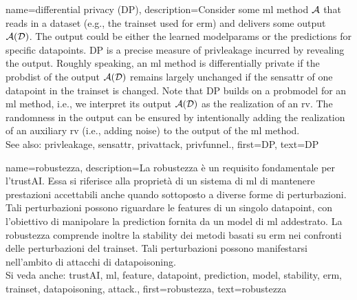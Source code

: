 {name={differential privacy (DP)},
  description={Consider some \gls{ml} method $\mathcal{A}$ 
  	that reads in a \gls{dataset} (e.g., the \gls{trainset} 
  	used for \gls{erm}) and delivers some output $\mathcal{A}(\mathcal{D})$. The output 
  	could be either the learned \gls{modelparams} or the \glspl{prediction} for specific \glspl{datapoint}. 
  	DP is a precise measure of \gls{privleakage} incurred by revealing the 
  	output. Roughly speaking, an \gls{ml} method is differentially private if the \gls{probdist} 
  	of the output $\mathcal{A}(\mathcal{D})$ remains largely unchanged if the \gls{sensattr} 
  	of one \gls{datapoint} in the \gls{trainset} is changed. Note that DP 
  	builds on a \gls{probmodel} for an \gls{ml} method, i.e., we interpret its output $\mathcal{A}(\mathcal{D})$ 
  	as the \gls{realization} of an \gls{rv}. The randomness in the output can be ensured 
  	by intentionally adding the \gls{realization} of an auxiliary \gls{rv} (i.e., adding noise) to 
  	the output of the \gls{ml} method.
				\\ 
	See also: \gls{privleakage}, \gls{sensattr}, \gls{privattack}, \gls{privfunnel}.}, 
  first={DP}, 
  text={DP} 
}

{name={robustezza},
	description={La robustezza è un requisito fondamentale per l'\gls{trustAI}. Essa si 
	riferisce alla proprietà di un sistema di \gls{ml} di mantenere prestazioni accettabili anche quando 
	sottoposto a diverse forme di perturbazioni. Tali perturbazioni possono riguardare le \glspl{feature} 
		di un singolo \gls{datapoint}, con l’obiettivo di manipolare la \gls{prediction} fornita da un \gls{model}
		di \gls{ml} addestrato. 
		La robustezza comprende inoltre la \gls{stability} dei metodi basati su \gls{erm} nei confronti delle 
		perturbazioni del \gls{trainset}. Tali perturbazioni possono manifestarsi nell’ambito di attacchi di 
		\gls{datapoisoning}.
		\\ 
		Si veda anche: \gls{trustAI}, \gls{ml}, \gls{feature}, \gls{datapoint}, \gls{prediction}, \gls{model}, \gls{stability}, \gls{erm}, \gls{trainset}, \gls{datapoisoning}, \gls{attack}.}, 
	first={robustezza}, 
	text={robustezza} 
}

